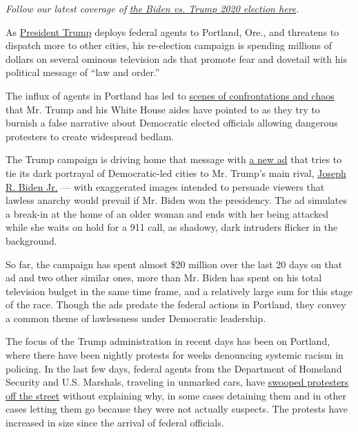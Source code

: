 \emph{Follow our latest coverage of}
\href{https://www.nytimes.com/2020/08/07/us/elections/biden-vs-trump.html}{\emph{the
Biden vs. Trump 2020 election here}}\emph{.}

As
\href{https://www.nytimes.com/interactive/2020/us/elections/donald-trump.html}{President
Trump} deploys federal agents to Portland, Ore., and threatens to
dispatch more to other cities, his re-election campaign is spending
millions of dollars on several ominous television ads that promote fear
and dovetail with his political message of ``law and order.''

The influx of agents in Portland has led to
\href{https://www.nytimes.com/2020/07/21/us/portland-protests.html}{scenes
of confrontations and chaos} that Mr. Trump and his White House aides
have pointed to as they try to burnish a false narrative about
Democratic elected officials allowing dangerous protesters to create
widespread bedlam.

The Trump campaign is driving home that message with
\href{https://www.youtube.com/watch?v=moZOrq0qL3Q\&feature=youtu.be}{a
new ad} that tries to tie its dark portrayal of Democratic-led cities to
Mr. Trump's main rival,
\href{https://www.nytimes.com/interactive/2020/us/elections/joe-biden.html}{Joseph
R. Biden Jr.} --- with exaggerated images intended to persuade viewers
that lawless anarchy would prevail if Mr. Biden won the presidency. The
ad simulates a break-in at the home of an older woman and ends with her
being attacked while she waits on hold for a 911 call, as shadowy, dark
intruders flicker in the background.

So far, the campaign has spent almost \$20 million over the last 20 days
on that ad and two other similar ones, more than Mr. Biden has spent on
his total television budget in the same time frame, and a relatively
large sum for this stage of the race. Though the ads predate the federal
actions in Portland, they convey a common theme of lawlessness under
Democratic leadership.

The focus of the Trump administration in recent days has been on
Portland, where there have been nightly protests for weeks denouncing
systemic racism in policing. In the last few days, federal agents from
the Department of Homeland Security and U.S. Marshals, traveling in
unmarked cars, have
\href{https://www.nytimes.com/2020/07/17/us/portland-protests.html}{swooped
protesters off the street} without explaining why, in some cases
detaining them and in other cases letting them go because they were not
actually suspects. The protests have increased in size since the arrival
of federal officials.

